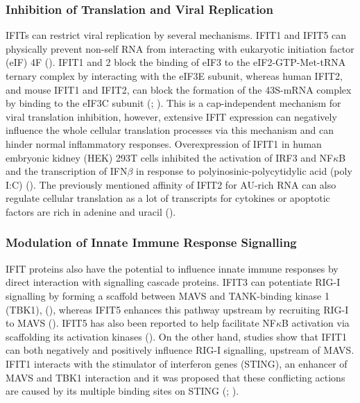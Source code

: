 \subsubsection{Inhibition of Translation and Viral Replication} \label{Inhibition of Translation and Viral Replication}
IFITs can restrict viral replication by several mechanisms. IFIT1 and IFIT5 can physically prevent non-self RNA from interacting with eukaryotic initiation factor (eIF) 4F (\cite{Kumar2014InhibitionMRNAs}). IFIT1 and 2 block the binding of eIF3 to the eIF2-GTP-Met-tRNA ternary complex by interacting with the eIF3E subunit, whereas human IFIT2, and mouse IFIT1 and IFIT2, can block the formation of the 43S-mRNA complex by binding to the eIF3C subunit (\cite{Diamond2014IFIT1:Translation}; \cite{Guo2000CharacterizationVirus}). This is a cap-independent mechanism for viral translation inhibition, however, extensive IFIT expression can negatively influence the whole cellular translation processes via this mechanism and can hinder normal inflammatory responses. Overexpression of IFIT1 in human embryonic kidney (HEK) 293T cells inhibited the activation of IRF3 and NF\(\kappa\)B and the transcription of IFN\(\beta\) in response to polyinosinic-polycytidylic acid (poly I:C) (\cite{Li2009ISG56Response}). The previously mentioned affinity of IFIT2 for AU-rich RNA can also regulate cellular translation as a lot of transcripts for cytokines or apoptotic factors are rich in adenine and uracil (\cite{Palanisamy2012ControlMicroRNAs}). 

\subsubsection{Modulation of Innate Immune Response Signalling} \label{Modulation of Innate Immune Response Signalling}
IFIT proteins also have the potential to influence innate immune responses by direct interaction with signalling cascade proteins. IFIT3 can potentiate RIG-I signalling by forming a scaffold between MAVS and TANK-binding kinase 1 (TBK1), (\cite{Liu2011IFN-InducedTBK1}), whereas IFIT5 enhances this pathway upstream by recruiting RIG-I to MAVS (\cite{Zhang2013IFIT5Pathways}). IFIT5 has also been reported to help facilitate NF\(\kappa\)B activation via scaffolding its activation kinases (\cite{Zhang2013IFIT5Pathways}). On the other hand, studies show that IFIT1 can both negatively and positively influence RIG-I signalling, upstream of MAVS. IFIT1 interacts with the stimulator of interferon genes (STING), an enhancer of MAVS and TBK1 interaction and it was proposed that these conflicting actions are caused by its multiple binding sites on STING (\cite{Li2009ISG56Response}; \cite{Reynaud2015IFIT1Interferon}). 

